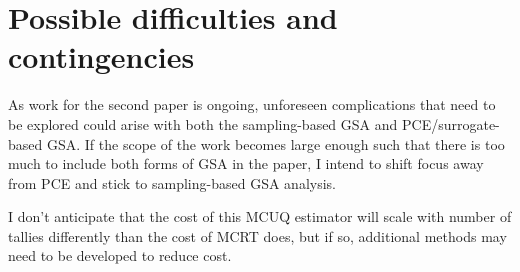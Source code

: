 \section{Possible difficulties and contingencies}
As work for the second paper is ongoing, unforeseen complications that need to be explored could arise with both the sampling-based GSA and PCE/surrogate-based GSA. If the scope of the work becomes large enough such that there is too much to include both forms of GSA in the paper, I intend to shift focus away from PCE and stick to sampling-based GSA analysis.

I don't anticipate that the cost of this MCUQ estimator will scale with number of tallies differently than the cost of MCRT does, but if so, additional methods may need to be developed to reduce cost.
